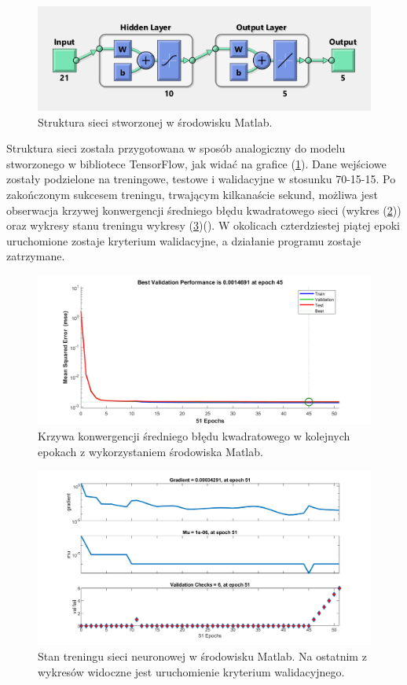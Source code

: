 \documentclass[12pt, a4paper]{article}
\let\oldref\ref
\renewcommand{\ref}[1]{(\oldref{#1})}
\begin{document}
 \begin{figure}[ht]
    \centering
    \includegraphics[width=1\textwidth]{siecmatlab}
    \caption{Struktura sieci stworzonej w środowisku Matlab.}
    \label{fig:siecmatlab}
\end{figure}

Struktura sieci została przygotowana w sposób analogiczny do modelu stworzonego w bibliotece TensorFlow, jak widać na grafice \ref{fig:siecmatlab}. Dane wejściowe zostały podzielone na treningowe, testowe i walidacyjne w stosunku 70-15-15. Po zakończonym sukcesem treningu, trwającym kilkanaście sekund, możliwa jest obserwacja krzywej konwergencji średniego błędu kwadratowego sieci (wykres \ref{fig:matper}) oraz wykresy stanu treningu wykresy \ref{fig:matwyk}(). W okolicach czterdziestej piątej epoki uruchomione zostaje kryterium walidacyjne, a działanie programu zostaje zatrzymane.


 \begin{figure}[ht]
    \centering
    \includegraphics[width=1\textwidth]{performance}
    \caption{Krzywa konwergencji średniego błędu kwadratowego w kolejnych epokach z wykorzystaniem środowiska Matlab.}
    \label{fig:matper}
\end{figure}

 \begin{figure}[ht]
    \centering
    \includegraphics[width=1\textwidth]{training_state}
    \caption{Stan treningu sieci neuronowej w środowisku Matlab. Na ostatnim z wykresów widoczne jest uruchomienie kryterium walidacyjnego.}
    \label{fig:matwyk}
\end{figure}
\end{document}
